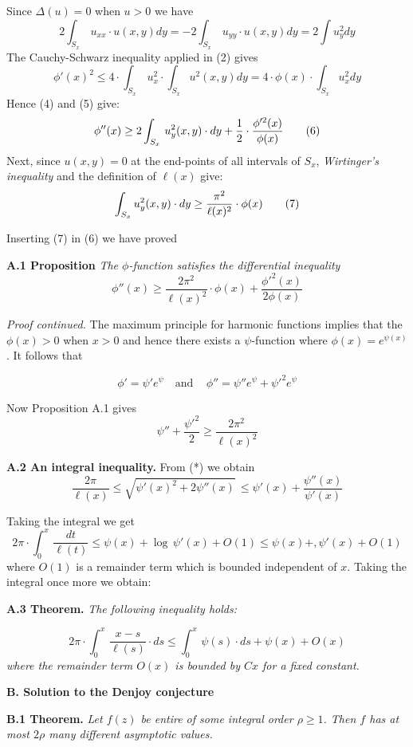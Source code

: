 \noindent
Since $\Delta(u)=0$ when $u>0$ we have
\[
2\int_{S_x}\,u_{xx}\cdot u(x,y) dy=-
2\int_{S_x}\,u_{yy}\cdot u(x,y) dy=
2\int u_y^2 dy\tag{4}
\]
The Cauchy-Schwarz inequality applied in (2) gives
\[
\phi'(x)^2\leq 4\cdot \int_{S_x}\,u^2_x\cdot\int_{S_x} u^2(x,y) dy
=4 \cdot \phi(x)\cdot \int_{S_x}u_x^2dy\tag{5}
\]
Hence (4) and (5) give:
\[ 
\phi''(x)\geq 2\int_{S_ x} \,u^2_y(x,y)\cdot dy+\frac{1}{2}\cdot \frac{\phi'^2(x)}{\phi(x)}\tag{6}
\]
Next, since $u(x,y)=0$ at the end-points of all intervals of $S_x$,
\emph{Wirtinger's 
inequality}
and the definition of $\ell(x)$ give:
\[
\int_{S_ x} u^2_y(x,y)\cdot dy\geq \frac{\pi^2}{\ell(x)^2}\cdot\phi(x)\tag{7}
\]


\noindent
Inserting (7) in (6) we have  proved
\medskip

\noindent
{\bf A.1 Proposition} \emph{The $\phi$-function satisfies the differential inequality}
\[
\phi''(x)\geq \frac{2\pi^2}{\ell(x)^2}\cdot\phi(x)+\frac{\phi'^2(x)}{2\phi(x)}
\]


\noindent
\emph{Proof continued.}
The maximum
principle for harmonic functions implies that the $\phi(x)>0$
when $x>0$ and hence there exists
a $\psi$-function where
$\phi(x)= e^{\psi(x)}$. It follows that

\[ 
\phi'=\psi' e^\psi\quad\text{and}\quad\,\phi''=
\psi''e^\psi+\psi'^2e^\psi
\]

\noindent
Now  Proposition A.1 gives
\[
 \psi''+\frac{\psi'^2}{2}\geq \frac{2\pi^2}{\ell(x)^2}\tag{*}
\]
\medskip


\noindent
{\bf {A.2 An integral inequality.}}
From (*) we obtain
\[
\frac{2\pi}{\ell(x)}\leq\sqrt{\psi'(x)^2+2\psi''(x)}\,\leq
\psi'(x)+\frac{\psi''(x)}{\psi'(x)}
\]
\medskip

\noindent
Taking the integral we get
\[ 
2\pi\cdot\int_0^x\,\frac{dt}{\ell(t)}\leq \psi(x)+\log\,\psi'(x)+O(1)
\leq \psi(x)+,\psi'(x)+O(1)\tag{**}
\]
where $O(1)$ is a remainder 
term which is bounded  independent of $x$. Taking the integral once more we 
obtain:
\medskip

\noindent
{\bf {A.3 Theorem.}}
\emph{The following inequality holds:}


\[
2\pi\cdot\int_0^x\, \frac{x-s}{\ell(s)}\cdot ds\leq
\int_0^x\,\psi(s)\cdot ds+\psi(x)+O(x)
\]
\emph{where the remainder term $O(x)$ is bounded by $Cx$ for 
a fixed constant.}

\bigskip


\centerline {\bf B. Solution to the Denjoy conjecture}
\bigskip

\noindent
{\bf B.1 Theorem.}
\emph{Let $f(z)$ be entire of some integral order
$\rho\geq 1$. Then $f$ has at most $2\rho$ many different asymptotic values.}
\bigskip


